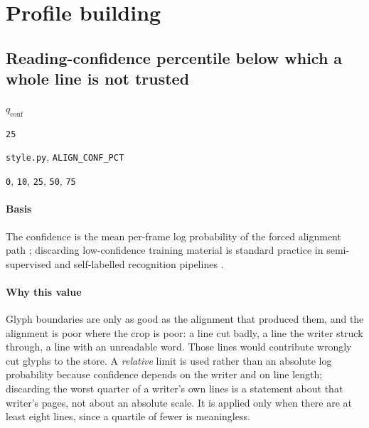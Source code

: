 \section{Profile building}

\subsection{Reading-confidence percentile below which a whole line is not trusted}

\label{coef:align-conf-pct}

\begin{description}[leftmargin=5.2em,style=sameline]

\item[Symbol] $q_{\text{conf}}$

\item[Value] \texttt{25}

\item[Source] \texttt{style.py}, \texttt{ALIGN\_CONF\_PCT}

\item[Swept] \texttt{0}, \texttt{10}, \texttt{25}, \texttt{50}, \texttt{75}

\end{description}

\paragraph{Basis}

The confidence is the mean per-frame log probability of the forced alignment path \cite[pp.~370--372]{graves2006}; discarding low-confidence training material is standard practice in semi-supervised and self-labelled recognition pipelines \cite{wigington2017}.

\paragraph{Why this value}

Glyph boundaries are only as good as the alignment that produced them, and the alignment is poor where the crop is poor: a line cut badly, a line the writer struck through, a line with an unreadable word. Those lines would contribute wrongly cut glyphs to the store. A \emph{relative} limit is used rather than an absolute log probability because confidence depends on the writer and on line length; discarding the worst quarter of a writer's own lines is a statement about that writer's pages, not about an absolute scale. It is applied only when there are at least eight lines, since a quartile of fewer is meaningless.

